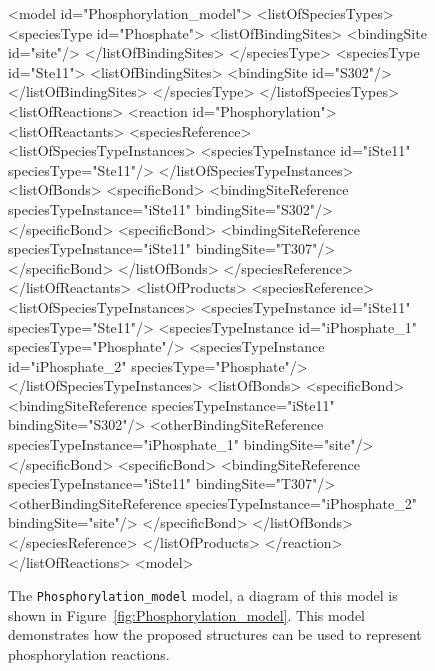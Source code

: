 \documentclass{cekarticle}
\begin{document}
\begin{figure}[h]
\begin{example}
<model id="Phosphorylation_model">
    <listOfSpeciesTypes>
        <speciesType id="Phosphate">
            <listOfBindingSites>
                <bindingSite id="site"/>
            </listOfBindingSites>
        </speciesType>
        <speciesType id="Ste11">
            <listOfBindingSites>
                <bindingSite id="S302"/>
            </listOfBindingSites>
        </speciesType>
    </listofSpeciesTypes>
    <listOfReactions>
        <reaction id="Phosphorylation">
            <listOfReactants>
                <speciesReference>
                    <listOfSpeciesTypeInstances>
                        <speciesTypeInstance id="iSte11" speciesType="Ste11"/>
                    </listOfSpeciesTypeInstances>
                    <listOfBonds>
                        <specificBond>
                            <bindingSiteReference
                                speciesTypeInstance="iSte11" bindingSite="S302"/>
                        </specificBond>
                        <specificBond>
                            <bindingSiteReference
                                speciesTypeInstance="iSte11" bindingSite="T307"/>
                        </specificBond>
                    </listOfBonds>
                </speciesReference>
            </listOfReactants>
            <listOfProducts>
                <speciesReference>
                    <listOfSpeciesTypeInstances>
                        <speciesTypeInstance id="iSte11" speciesType="Ste11"/>
                        <speciesTypeInstance id="iPhosphate_1" speciesType="Phosphate"/>
                        <speciesTypeInstance id="iPhosphate_2" speciesType="Phosphate"/>
                    </listOfSpeciesTypeInstances>
                    <listOfBonds>
                        <specificBond>
                            <bindingSiteReference speciesTypeInstance="iSte11"
                                bindingSite="S302"/>
                            <otherBindingSiteReference
                                speciesTypeInstance="iPhosphate_1" bindingSite="site"/>
                        </specificBond>
                        <specificBond>
                            <bindingSiteReference
                                speciesTypeInstance="iSte11" bindingSite="T307"/>
                            <otherBindingSiteReference
                                speciesTypeInstance="iPhosphate_2" bindingSite="site"/>
                        </specificBond>
                    </listOfBonds>
                </speciesReference>
            </listOfProducts>
        </reaction>
    </listOfReactions>
<model>
\end{example}
  \caption{The \texttt{Phosphorylation\_model} model, a diagram of this model is shown in
  Figure~\ref{fig:Phosphorylation_model}. This model demonstrates how the proposed structures can be
  used to represent phosphorylation reactions.}
  \label{fig:Phosphorylation_model-xml}
\end{figure}
\end{document}
